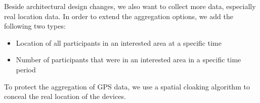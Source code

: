 Beside architectural design changes, we also want to collect more data, especially real location data. In order to extend the aggregation options, we add the following two types:
\begin{itemize}
    \item Location of all participants in an interested area at a specific time
    \item Number of participants that were in an interested area in a specific time period
\end{itemize}

To protect the aggregation of GPS data, we use a spatial cloaking algorithm to conceal the real location of the devices. 